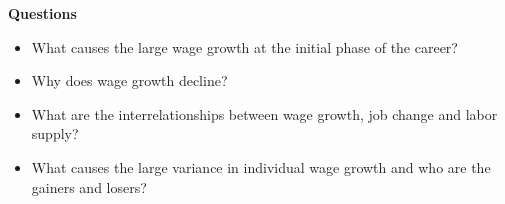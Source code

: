 \begin{frame}[plain]\centering
{}
\end{frame}
\begin{frame}\textbf{Questions}\vspace{0.3cm}

\begin{itemize}\setlength\itemsep{1em}
\item What causes the large wage growth at the initial phase of the career?
\item Why does wage growth decline?
\item What are the interrelationships between wage growth, job change and labor supply?
\item What causes the large variance in individual wage growth and who are the gainers and losers?
\end{itemize}

\end{frame}
